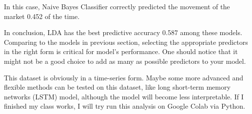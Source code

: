 \documentclass[
]{article}
\newenvironment{Shaded}{\begin{snugshade}}{\end{snugshade}}
\newcommand{\AttributeTok}[1]{\textcolor[rgb]{0.77,0.63,0.00}{#1}}
\newcommand{\DecValTok}[1]{\textcolor[rgb]{0.00,0.00,0.81}{#1}}
\newcommand{\FloatTok}[1]{\textcolor[rgb]{0.00,0.00,0.81}{#1}}
\newcommand{\FunctionTok}[1]{\textcolor[rgb]{0.00,0.00,0.00}{#1}}
\newcommand{\NormalTok}[1]{#1}
\newcommand{\OtherTok}[1]{\textcolor[rgb]{0.56,0.35,0.01}{#1}}
\newcommand{\SpecialCharTok}[1]{\textcolor[rgb]{0.00,0.00,0.00}{#1}}
\begin{document}
\begin{Shaded}
\end{Shaded}

In this case, Naive Bayes Classifier correctly predicted the movement of
the market 0.452 of the time.

In conclusion, LDA has the best predictive accuracy 0.587 among these
models. Comparing to the models in previous section, selecting the
appropriate predictors in the right form is critical for model's
performance. One should notice that it might not be a good choice to add
as many as possible predictors to your model.

This dataset is obviously in a time-series form. Maybe some more
advanced and flexible methods can be tested on this dataset, like long
short-term memory networks (LSTM) model, although the model will become
less interpretable. If I finished my class works, I will try run this
analysis on Google Colab via Python.
\end{document}
